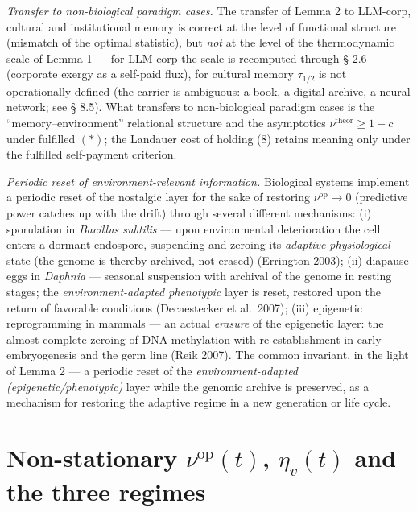 \documentclass[pdflatex,sn-mathphys-ay]{sn-jnl}
\begin{document}
\emph{Transfer to non-biological paradigm cases.} The transfer of Lemma 2 to LLM-corp, cultural and institutional memory is correct at the level of functional structure (mismatch of the optimal statistic), but \emph{not} at the level of the thermodynamic scale of Lemma 1 --- for LLM-corp the scale is recomputed through § 2.6 (corporate exergy as a self-paid flux), for cultural memory \(\tau_{1/2}\) is not operationally defined (the carrier is ambiguous: a book, a digital archive, a neural network; see § 8.5). What transfers to non-biological paradigm cases is the ``memory--environment'' relational structure and the asymptotics \(\nu^{\text{theor}} \ge 1-c\) under fulfilled \((*)\); the Landauer cost of holding (8) retains meaning only under the fulfilled self-payment criterion.



\emph{Periodic reset of environment-relevant information.} Biological systems implement a periodic reset of the nostalgic layer for the sake of restoring \(\nu^{\text{op}} \to 0\) (predictive power catches up with the drift) through several different mechanisms: (i) sporulation in \emph{Bacillus subtilis} --- upon environmental deterioration the cell enters a dormant endospore, suspending and zeroing its \emph{adaptive-physiological} state (the genome is thereby archived, not erased) (Errington 2003); (ii) diapause eggs in \emph{Daphnia} --- seasonal suspension with archival of the genome in resting stages; the \emph{environment-adapted phenotypic} layer is reset, restored upon the return of favorable conditions (Decaestecker et al.~2007); (iii) epigenetic reprogramming in mammals --- an actual \emph{erasure} of the epigenetic layer: the almost complete zeroing of DNA methylation with re-establishment in early embryogenesis and the germ line (Reik 2007). The common invariant, in the light of Lemma 2 --- a periodic reset of the \emph{environment-adapted (epigenetic/phenotypic)} layer while the genomic archive is preserved, as a mechanism for restoring the adaptive regime in a new generation or life cycle.



\section{\texorpdfstring{Non-stationary \(\nu^{\text{op}}(t)\), \(\eta_v(t)\) and the three regimes}{Non-stationary \textbackslash nu\^{}\{\textbackslash text\{op\}\}(t), \textbackslash eta\_v(t) and the three regimes}}\label{non-stationary-nutextopt-eta_vt-and-the-three-regimes}
\end{document}
